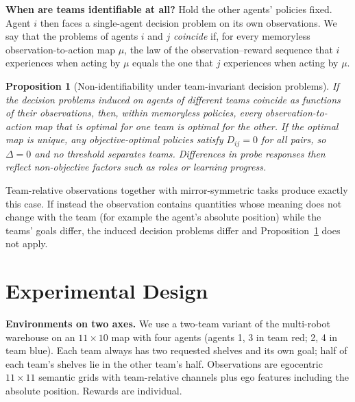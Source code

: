 \documentclass{article}
\newtheorem{proposition}{Proposition}
\theoremstyle{remark}
\newcommand{\todo}[1]{\textcolor{red}{[TODO: #1]}}
\begin{document}
\textbf{When are teams identifiable at all?} Hold the other agents' policies fixed. Agent $i$ then faces a single-agent
decision problem on its own observations. We say that the problems of agents $i$ and $j$ \emph{coincide} if, for every memoryless
observation-to-action map $\mu$, the law of the observation--reward sequence that $i$ experiences when acting by $\mu$ equals the
one that $j$ experiences when acting by $\mu$.
\begin{proposition}[Non-identifiability under team-invariant decision problems]
\label{prop:nonid}
If the decision problems induced on agents of different teams coincide as functions of their observations, then, within
memoryless policies, every observation-to-action map that is optimal for one team is optimal for the other. If the optimal map is unique, any
objective-optimal policies satisfy $D_{ij}=0$ for all pairs, so $\Delta=0$ and no threshold separates teams. Differences in
probe responses then reflect non-objective factors such as roles or learning progress.
\end{proposition}
Team-relative observations together with mirror-symmetric tasks produce exactly this case. If instead the observation contains
quantities whose meaning does not change with the team (for example the agent's absolute position) while the teams' goals
differ, the induced decision problems differ and Proposition~\ref{prop:nonid} does not apply.

\section{Experimental Design}
\label{sec:setup}
\textbf{Environments on two axes.} We use a two-team variant of the multi-robot warehouse \cite{papoudakis2021benchmarking}
on an $11\times10$ map with four agents (agents 1, 3 in team red; 2, 4 in team blue). Each team always has two requested
shelves and its own goal; half of each team's shelves lie in the other team's half. Observations are egocentric $11\times11$
semantic grids with team-relative channels plus ego features including the absolute position. Rewards are individual.

\begin{table}[t]
\centering
\small
{}
\caption{Environments placed on the two axes of the analysis. E1: identifiability ruled out by Proposition~\ref{prop:nonid};
within-team compatibility measured to be lower than across teams. E1-F: identifiability expected; compatibility to be measured.
\todo{place E1-F after measurement}}
\label{tab:axes}
\end{table}
\end{document}
